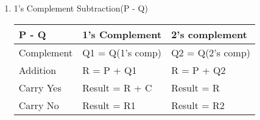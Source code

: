 \begin{enumerate}
    \item 1's Complement Subtraction(P - Q)\\
    \begin{myTableStyle} \begin{tabular}{ |m{3cm}|m{3cm}|m{3cm}| }  \hline
        P - Q       &   1's Complement      &  2's complement       \\ \hline
        Complement  &   Q1 = Q(1's comp)    &  Q2 = Q(2's comp)     \\ \hline
        Addition    &   R = P + Q1          &  R = P + Q2           \\ \hline
        Carry Yes   &   Result = R + C      &  Result = R           \\ \hline
        Carry No    &   Result = R1         &  Result = R2          \\ \hline
    \end{tabular} \end{myTableStyle} \vspace{0.08in}

\end{enumerate}
